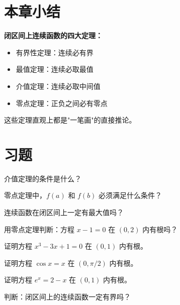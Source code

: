 \section{本章小结}

\begin{progressbox}
\textbf{闭区间上连续函数的四大定理：}
\begin{itemize}
  \item 有界性定理：连续必有界
  \item 最值定理：连续必取最值
  \item 介值定理：连续必取中间值
  \item 零点定理：正负之间必有零点
\end{itemize}

这些定理直观上都是"一笔画"的直接推论。
\end{progressbox}

\section{习题}

\begin{exercise}[0]
介值定理的条件是什么？
\end{exercise}
\begin{exercise}[0]
零点定理中，\(f(a)\) 和 \(f(b)\) 必须满足什么条件？
\end{exercise}
\begin{exercise}[0]
连续函数在闭区间上一定有最大值吗？
\end{exercise}
\begin{exercise}[0]
用零点定理判断：方程 \(x-1=0\) 在 \((0,2)\) 内有根吗？
\end{exercise}

\begin{exercise}[1]
证明方程 \(x^3 - 3x + 1 = 0\) 在 \((0,1)\) 内有根。
\end{exercise}
\begin{exercise}[1]
证明方程 \(\cos x = x\) 在 \((0,\pi/2)\) 内有根。
\end{exercise}
\begin{exercise}[1]
证明方程 \(e^x = 2 - x\) 在 \((0,1)\) 内有根。
\end{exercise}
\begin{exercise}[1]
判断：闭区间上的连续函数一定有界吗？
\end{exercise}


